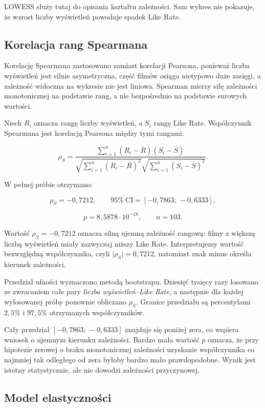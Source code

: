 \documentclass[12pt,a4paper]{article}
\begin{document}
LOWESS służy tutaj do opisania kształtu zależności. Sam wykres nie pokazuje, że wzrost liczby wyświetleń powoduje spadek Like Rate.

\subsection{Korelacja rang Spearmana}

Korelację Spearmana zastosowano zamiast korelacji Pearsona, ponieważ liczba wyświetleń jest silnie asymetryczna, część filmów osiąga nietypowo duże zasięgi, a zależność widoczna na wykresie nie jest liniowa. Spearman mierzy siłę zależności monotonicznej na podstawie rang, a nie bezpośrednio na podstawie surowych wartości.

Niech $R_i$ oznacza rangę liczby wyświetleń, a $S_i$ rangę Like Rate. Współczynnik Spearmana jest korelacją Pearsona między tymi rangami:

\[
\rho_S=
\frac{
    \sum_{i=1}^{n}(R_i-\overline{R})(S_i-\overline{S})
}{
    \sqrt{\sum_{i=1}^{n}(R_i-\overline{R})^2}
    \sqrt{\sum_{i=1}^{n}(S_i-\overline{S})^2}
}.
\]

W pełnej próbie otrzymano:

\[
\rho_S=-0{,}7212,
\qquad
95\%\ \mathrm{CI}=[-0{,}7863;\,-0{,}6333],
\]

\[
p=8{,}5878\cdot 10^{-18},
\qquad
n=103.
\]

Wartość $\rho_S=-0{,}7212$ oznacza silną ujemną zależność rangową: filmy z większą liczbą wyświetleń miały zazwyczaj niższy Like Rate. Interpretujemy wartość bezwzględną współczynnika, czyli $\lvert\rho_S\rvert=0{,}7212$, natomiast znak minus określa kierunek zależności.

Przedział ufności wyznaczono metodą bootstrapu. Dziesięć tysięcy razy losowano ze zwracaniem całe pary \emph{liczba wyświetleń--Like Rate}, a następnie dla każdej wylosowanej próby ponownie obliczano $\rho_S$. Granice przedziału są percentylami $2{,}5\%$ i $97{,}5\%$ otrzymanych współczynników.

Cały przedział $[-0{,}7863;\,-0{,}6333]$ znajduje się poniżej zera, co wspiera wniosek o ujemnym kierunku zależności. Bardzo mała wartość $p$ oznacza, że przy hipotezie zerowej o braku monotonicznej zależności uzyskanie współczynnika co najmniej tak odległego od zera byłoby bardzo mało prawdopodobne. Wynik jest istotny statystycznie, ale nie dowodzi zależności przyczynowej.

\subsection{Model elastyczności}
\end{document}
